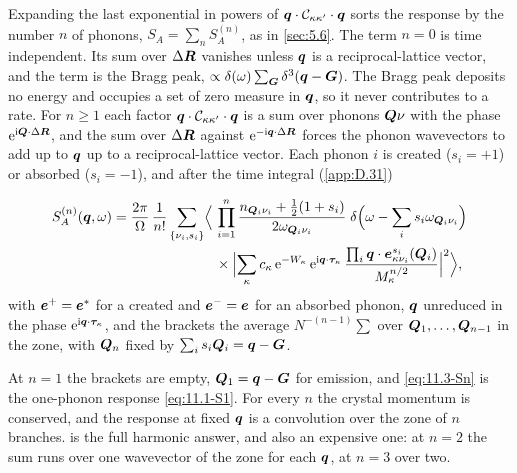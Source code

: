 Expanding the last exponential in powers of $\bm{q}\cdot\mathcal{C}_{\kappa\kappa'}\cdot\bm{q}$ sorts the response by the number $n$ of phonons, $S_A = \sum_nS^{(n)}_A$, as in \cref{sec:5.6}. The term $n = 0$ is time independent. Its sum over $\Delta\bm{R}$ vanishes unless $\bm{q}$ is a reciprocal-lattice vector, and the term is the Bragg peak, $\propto\delta(\omega)\sum_{\bm{G}}\delta^3(\bm{q} - \bm{G})$. The Bragg peak deposits no energy and occupies a set of zero measure in $\bm{q}$, so it never contributes to a rate. For $n \ge 1$ each factor $\bm{q}\cdot\mathcal{C}_{\kappa\kappa'}\cdot\bm{q}$ is a sum over phonons $\bm{Q}\nu$ with the phase $\mathrm{e}^{\mathrm{i}\bm{Q}\cdot\Delta\bm{R}}$, and the sum over $\Delta\bm{R}$ against $\mathrm{e}^{-\mathrm{i}\bm{q}\cdot\Delta\bm{R}}$ forces the phonon wavevectors to add up to $\bm{q}$ up to a reciprocal-lattice vector. Each phonon $i$ is created ($s_i = +1$) or absorbed ($s_i = -1$), and after the time integral (\cref{app:D.31})
\begin{keyresult}
\begin{equation}
  \begin{aligned}
  S^{(n)}_A(\bm{q},\omega) = \frac{2\pi}{\Omega}\,\frac{1}{n!}\sum_{\{\nu_i,s_i\}}\Bigl\langle\,&\prod_{i=1}^{n}\frac{n_{\bm{Q}_i\nu_i} + \frac12(1 + s_i)}{2\omega_{\bm{Q}_i\nu_i}}\;\delta\Bigl(\omega - \sum_is_i\omega_{\bm{Q}_i\nu_i}\Bigr) \\
  &\times\Bigl|\sum_\kappa c_\kappa\,\mathrm{e}^{-W_\kappa}\,\mathrm{e}^{\mathrm{i}\bm{q}\cdot\bm{\tau}_\kappa}\,\frac{\prod_i\bm{q}\cdot\bm{e}^{s_i}_{\kappa\nu_i}(\bm{Q}_i)}{M_\kappa^{n/2}}\Bigr|^2\Bigr\rangle ,
  \end{aligned}
  \label{eq:11.3-Sn}
\end{equation}
with $\bm{e}^{+} = \bm{e}^*$ for a created and $\bm{e}^{-} = \bm{e}$ for an absorbed phonon, $\bm{q}$ unreduced in the phase $\mathrm{e}^{\mathrm{i}\bm{q}\cdot\bm{\tau}_\kappa}$, and the brackets the average $N^{-(n-1)}\sum$ over $\bm{Q}_1, \ldots, \bm{Q}_{n-1}$ in the zone, with $\bm{Q}_n$ fixed by $\sum_is_i\bm{Q}_i = \bm{q} - \bm{G}$.
\end{keyresult}
\noindent At $n = 1$ the brackets are empty, $\bm{Q}_1 = \bm{q} - \bm{G}$ for emission, and \cref{eq:11.3-Sn} is the one-phonon response \cref{eq:11.1-S1}. For every $n$ the crystal momentum is conserved, and the response at fixed $\bm{q}$ is a convolution over the zone of $n$ branches.  is the full harmonic answer, and also an expensive one: at $n = 2$ the sum runs over one wavevector of the zone for each $\bm{q}$, at $n = 3$ over two.

